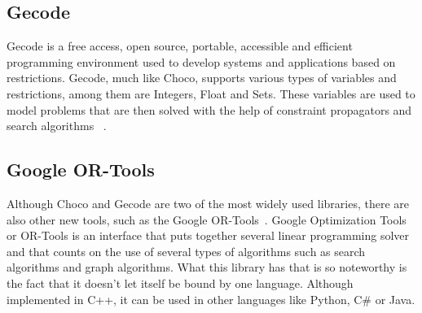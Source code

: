 \subsection{Gecode}

Gecode is a free access, open source, portable, accessible and efficient programming environment used to develop systems and applications based on restrictions. Gecode, much like Choco, supports various types of variables and restrictions, among them are Integers, Float and Sets. These variables are used to model problems that are then solved with the help of constraint propagators and search algorithms \cite{MPG:M:5.1.0}~\cite{gecode}.

\subsection{Google OR-Tools}

Although Choco and Gecode are two of the most widely used libraries, there are also other new tools, such as the Google OR-Tools~\cite{ORTools}. Google Optimization Tools or OR-Tools is an interface that puts together several linear programming solver and that counts on the use of several types of algorithms such as search algorithms and graph algorithms. What this library has that is so noteworthy is the fact that it doesn't let itself be bound by one language. Although implemented in C++, it can be used in other languages like Python, C\# or Java.